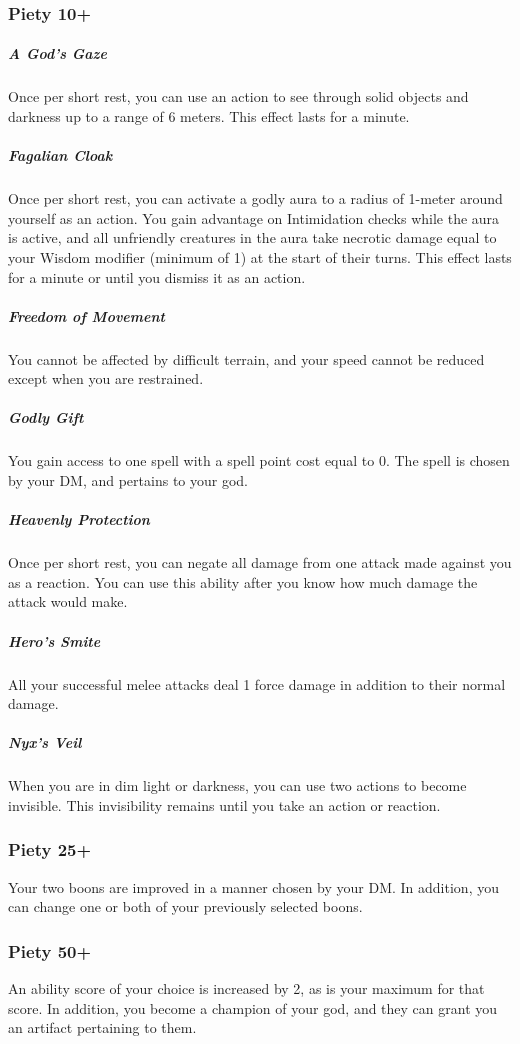 \pagebreak

\subsubsection{Piety 10+}
    \subparagraph{A God's Gaze}
        Once per short rest, you can use an action to see through solid objects and darkness up to a range of 6 meters.
        This effect lasts for a minute.
    \subparagraph{Fagalian Cloak}
        Once per short rest, you can activate a godly aura to a radius of 1-meter around yourself as an action.
        You gain advantage on Intimidation checks while the aura is active, and all unfriendly creatures in the aura take necrotic damage equal to your Wisdom modifier (minimum of 1) at the start of their turns.
        This effect lasts for a minute or until you dismiss it as an action.
    \subparagraph{Freedom of Movement}
        You cannot be affected by difficult terrain, and your speed cannot be reduced except when you are restrained.
    \subparagraph{Godly Gift}
        You gain access to one spell with a spell point cost equal to 0.
        The spell is chosen by your DM, and pertains to your god.
    \subparagraph{Heavenly Protection}
        Once per short rest, you can negate all damage from one attack made against you as a reaction.
        You can use this ability after you know how much damage the attack would make.
    \subparagraph{Hero's Smite}
        All your successful melee attacks deal 1 force damage in addition to their normal damage.
    \subparagraph{Nyx's Veil}
        When you are in dim light or darkness, you can use two actions to become invisible.
        This invisibility remains until you take an action or reaction.

\subsubsection{Piety 25+}
    Your two boons are improved in a manner chosen by your DM.
    In addition, you can change one or both of your previously selected boons.

\subsubsection{Piety 50+}
    An ability score of your choice is increased by 2, as is your maximum for that score.
    In addition, you become a champion of your god, and they can grant you an artifact pertaining to them.

\newpage
